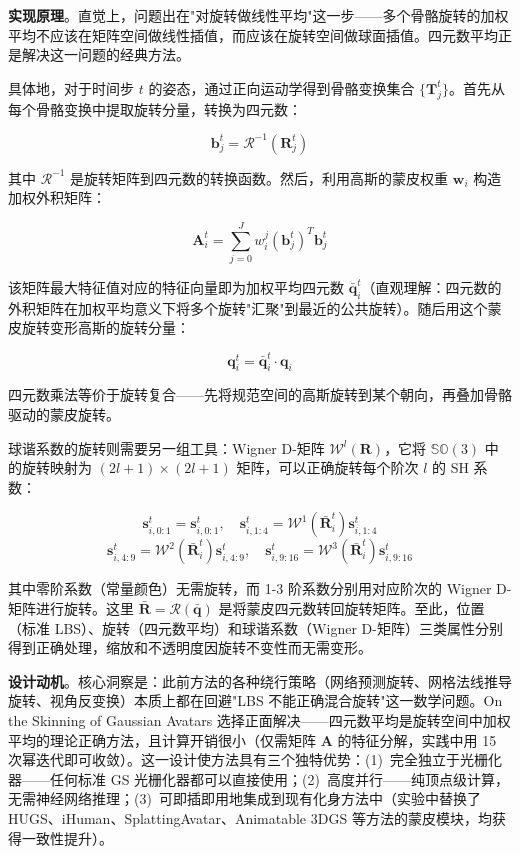 \textbf{实现原理}。直觉上，问题出在"对旋转做线性平均"这一步——多个骨骼旋转的加权平均不应该在矩阵空间做线性插值，而应该在旋转空间做球面插值。四元数平均正是解决这一问题的经典方法。

具体地，对于时间步 $t$ 的姿态，通过正向运动学得到骨骼变换集合 $\{\boldsymbol{T}_{j}^{t}\}$。首先从每个骨骼变换中提取旋转分量，转换为四元数：

\[
\mathbf{b}_{j}^{t} = \mathcal{R}^{-1}(\boldsymbol{R}_{j}^{t})
\]

其中 $\mathcal{R}^{-1}$ 是旋转矩阵到四元数的转换函数。然后，利用高斯的蒙皮权重 $\boldsymbol{w}_i$ 构造加权外积矩阵：

\[
\mathbf{A}_{i}^{t} = \sum_{j=0}^{J} w_{i}^{j} (\mathbf{b}_{j}^{t})^{T}\mathbf{b}_{j}^{t}
\]

该矩阵最大特征值对应的特征向量即为加权平均四元数 $\bar{\boldsymbol{q}}_{i}^{t}$（直观理解：四元数的外积矩阵在加权平均意义下将多个旋转"汇聚"到最近的公共旋转）。随后用这个蒙皮旋转变形高斯的旋转分量：

\[
\boldsymbol{q}_{i}^{t} = \bar{\boldsymbol{q}}_{i}^{t} \cdot \boldsymbol{q}_{i}
\]

四元数乘法等价于旋转复合——先将规范空间的高斯旋转到某个朝向，再叠加骨骼驱动的蒙皮旋转。

球谐系数的旋转则需要另一组工具：Wigner D-矩阵 $\mathcal{W}^{l}(\boldsymbol{R})$，它将 $\mathbb{SO}(3)$ 中的旋转映射为 $(2l+1) \times (2l+1)$ 矩阵，可以正确旋转每个阶次 $l$ 的 SH 系数：

\[
\boldsymbol{s}_{i,0:1}^{t} = \boldsymbol{s}_{i,0:1}^{t}, \quad \boldsymbol{s}_{i,1:4}^{t} = \mathcal{W}^{1}(\bar{\boldsymbol{R}}_{i}^{t}) \boldsymbol{s}_{i,1:4}^{t}
\]
\[
\boldsymbol{s}_{i,4:9}^{t} = \mathcal{W}^{2}(\bar{\boldsymbol{R}}_{i}^{t}) \boldsymbol{s}_{i,4:9}^{t}, \quad \boldsymbol{s}_{i,9:16}^{t} = \mathcal{W}^{3}(\bar{\boldsymbol{R}}_{i}^{t}) \boldsymbol{s}_{i,9:16}^{t}
\]

其中零阶系数（常量颜色）无需旋转，而 1-3 阶系数分别用对应阶次的 Wigner D-矩阵进行旋转。这里 $\bar{\boldsymbol{R}} = \mathcal{R}(\bar{\boldsymbol{q}})$ 是将蒙皮四元数转回旋转矩阵。至此，位置（标准 LBS）、旋转（四元数平均）和球谐系数（Wigner D-矩阵）三类属性分别得到正确处理，缩放和不透明度因旋转不变性而无需变形。

\textbf{设计动机}。核心洞察是：此前方法的各种绕行策略（网络预测旋转、网格法线推导旋转、视角反变换）本质上都在回避"LBS 不能正确混合旋转"这一数学问题。On the Skinning of Gaussian Avatars 选择正面解决——四元数平均是旋转空间中加权平均的理论正确方法，且计算开销很小（仅需矩阵 $\mathbf{A}$ 的特征分解，实践中用 15 次幂迭代即可收敛）。这一设计使方法具有三个独特优势：(1)~完全独立于光栅化器——任何标准 GS 光栅化器都可以直接使用；(2)~高度并行——纯顶点级计算，无需神经网络推理；(3)~可即插即用地集成到现有化身方法中（实验中替换了 HUGS、iHuman、SplattingAvatar、Animatable 3DGS 等方法的蒙皮模块，均获得一致性提升）。

